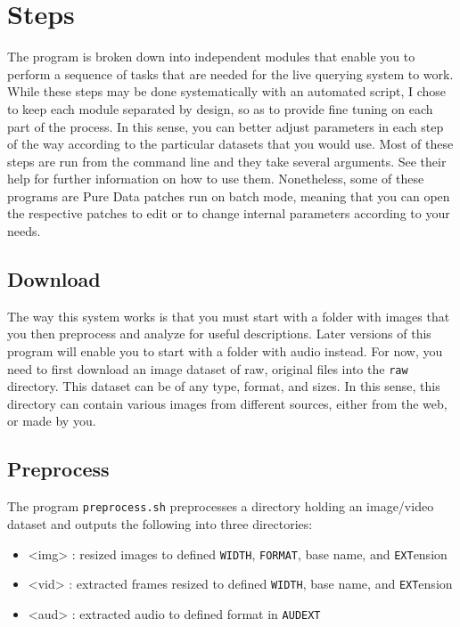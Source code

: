 \section{Steps}

The program is broken down into independent modules that enable you to perform a sequence of tasks that are needed for the live querying system to work. While these steps may be done systematically with an automated script, I chose to keep each module separated by design, so as to provide fine tuning on each part of the process. In this sense, you can better adjust parameters in each step of the way according to the particular datasets that you would use. Most of these steps are run from the command line and they take several arguments. See their help for further information on how to use them. Nonetheless, some of these programs are Pure Data patches run on batch mode, meaning that you can open the respective patches to edit or to change internal parameters according to your needs.

\subsection{Download}

The way this system works is that you must start with a folder with images that you then preprocess and analyze for useful descriptions. Later versions of this program will enable you to start with a folder with audio instead. For now, you need to first download an image dataset of raw, original files into the \texttt{raw} directory. This dataset can be of any type, format, and sizes. In this sense, this directory can contain various images from different sources, either from the web, or made by you.

\subsection{Preprocess}

The program \texttt{preprocess.sh} preprocesses a directory holding an image/video dataset and outputs the following into three directories:

\begin{itemize}
\item <img> : resized images to defined \texttt{WIDTH}, \texttt{FORMAT}, base name, and \texttt{EXT}ension
\item <vid> : extracted frames resized to defined \texttt{WIDTH}, base name, and \texttt{EXT}ension
\item <aud> : extracted audio to defined format in \texttt{AUDEXT}
\end{itemize}

